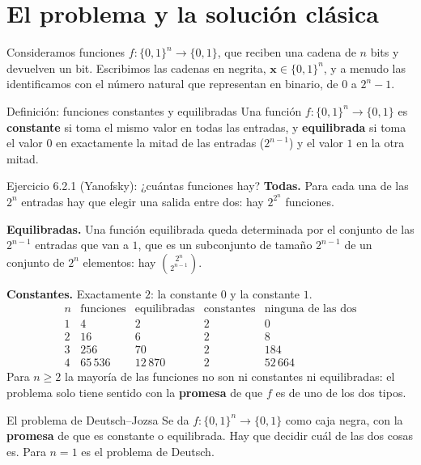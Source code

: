 \documentclass[11pt, a4paper, twoside, openright]{report}
\newcommand{\bx}{\mathbf{x}}
\newcommand{\bits}[1]{\{0,1\}^{#1}}
\begin{document}
\cleardoublepage
\section{El problema y la solución clásica}

\noindent Consideramos funciones $f:\bits{n}\to\{0,1\}$, que reciben una cadena de $n$ bits y devuelven un bit. Escribimos las cadenas en negrita, $\bx\in\bits{n}$, y a menudo las identificamos con el número natural que representan en binario, de $0$ a $2^n-1$.

\begin{teoria}{Definición: funciones constantes y equilibradas}
Una función $f:\bits{n}\to\{0,1\}$ es \textbf{constante} si toma el mismo valor en todas las entradas, y \textbf{equilibrada} si toma el valor $0$ en exactamente la mitad de las entradas ($2^{n-1}$) y el valor $1$ en la otra mitad.
\end{teoria}

\begin{ejercicio}{Ejercicio 6.2.1 (Yanofsky): ¿cuántas funciones hay?}
\textbf{Todas.} Para cada una de las $2^n$ entradas hay que elegir una salida entre dos: hay $2^{2^n}$ funciones.

\textbf{Equilibradas.} Una función equilibrada queda determinada por el conjunto de las $2^{n-1}$ entradas que van a $1$, que es un subconjunto de tamaño $2^{n-1}$ de un conjunto de $2^n$ elementos: hay $\binom{2^n}{2^{n-1}}$.

\textbf{Constantes.} Exactamente $2$: la constante $0$ y la constante $1$.
\[
\renewcommand{\arraystretch}{1.2}
\begin{array}{c|r|r|r|r}
n & \text{funciones} & \text{equilibradas} & \text{constantes} & \text{ninguna de las dos} \\ \hline
1 & 4 & 2 & 2 & 0 \\
2 & 16 & 6 & 2 & 8 \\
3 & 256 & 70 & 2 & 184 \\
4 & 65\,536 & 12\,870 & 2 & 52\,664
\end{array}
\]
Para $n\ge2$ la mayoría de las funciones no son ni constantes ni equilibradas: el problema solo tiene sentido con la \textbf{promesa} de que $f$ es de uno de los dos tipos.
\end{ejercicio}

\begin{teoria}{El problema de Deutsch--Jozsa}
Se da $f:\bits{n}\to\{0,1\}$ como caja negra, con la \textbf{promesa} de que es constante o equilibrada. Hay que decidir cuál de las dos cosas es. Para $n = 1$ es el problema de Deutsch.
\end{teoria}
\end{document}
